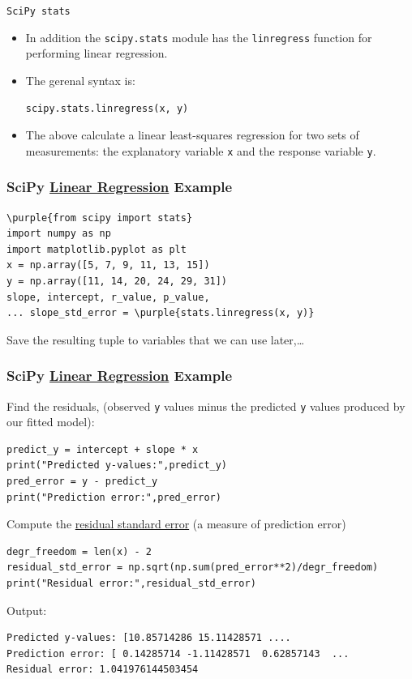 \documentclass[xcolor=svgnames]{beamer}
\newcommand{\purple}[1]{{\textcolor{purple}{#1}}}
\newcommand{\nl}{\\[1em]}
\newcommand{\ft}[1]{\frametitle{#1}}
\begin{document}
\begin{frame}[fragile]{\tt SciPy stats}
\begin{itemize}
\item In addition the {\tt scipy.stats} module has the {\tt linregress} function for performing linear regression.\nl
\item The gerenal syntax is:\
\begin{Verbatim}[frame=single]
scipy.stats.linregress(x, y)
\end{Verbatim}
\item The above calculate a linear least-squares regression for two sets of measurements:  the explanatory variable {\tt x} and the response variable {\tt y}.
\end{itemize}
\end{frame}

\begin{frame}[fragile]\ft{SciPy \href{https://docs.scipy.org/doc/scipy/reference/generated/scipy.stats.linregress.html}{Linear Regression} Example}
\begin{Verbatim}[xleftmargin=-.1in, fontsize=\small, commandchars=\\\{\}, frame=single] 
\purple{from scipy import stats}
import numpy as np
import matplotlib.pyplot as plt
x = np.array([5, 7, 9, 11, 13, 15])
y = np.array([11, 14, 20, 24, 29, 31])
slope, intercept, r_value, p_value, 
... slope_std_error = \purple{stats.linregress(x, y)}
\end{Verbatim}
Save the resulting tuple to variables that we can use later,\dots
\end{frame}



\begin{frame}[fragile]\ft{SciPy \href{https://docs.scipy.org/doc/scipy/reference/generated/scipy.stats.linregress.html}{Linear Regression} Example}
Find the residuals, (observed {\tt y} values minus the predicted {\tt y} values produced by our fitted model):
\begin{Verbatim}[xleftmargin=-.1in, fontsize=\small, commandchars=\\\{\}, frame=single] 
predict_y = intercept + slope * x
print("Predicted y-values:",predict_y)
pred_error = y - predict_y
print("Prediction error:",pred_error)
\end{Verbatim}
Compute the \href{https://www.investopedia.com/terms/r/residual-standard-deviation.asp}{residual standard error} (a measure of prediction error)
\begin{Verbatim}[xleftmargin=-.1in, fontsize=\small, commandchars=\\\{\}, frame=single] 
degr_freedom = len(x) - 2
residual_std_error = np.sqrt(np.sum(pred_error**2)/degr_freedom)
print("Residual error:",residual_std_error)
\end{Verbatim}
Output:
\begin{Verbatim}[frame=single]
Predicted y-values: [10.85714286 15.11428571 ....
Prediction error: [ 0.14285714 -1.11428571  0.62857143  ...
Residual error: 1.041976144503454
\end{Verbatim}
\end{frame}
\end{document}

